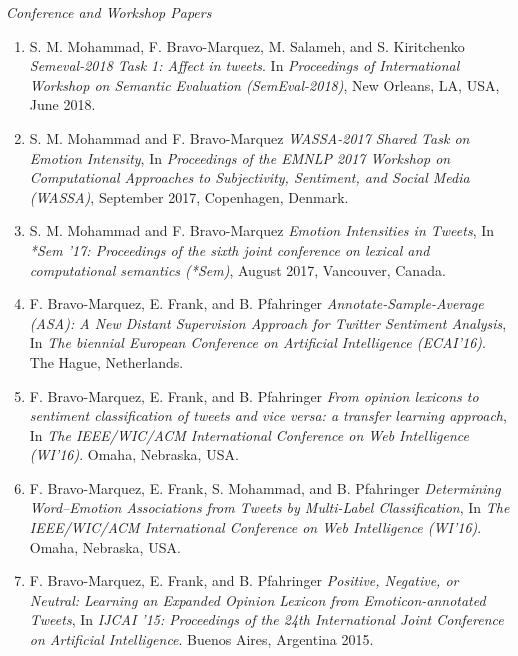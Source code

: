 \documentclass[letterpaper]{article}
\begin{document}
\begin{flushleft}
\emph{Conference and Workshop Papers}
\end{flushleft}

\begin{enumerate}

\item S. M. Mohammad, F. Bravo-Marquez, M. Salameh, and S. Kiritchenko  \textit{Semeval-2018 Task 1: Affect in tweets}. In \textit{Proceedings of International Workshop on Semantic Evaluation (SemEval-2018)}, New Orleans, LA, USA, June 2018. 

\item  S. M. Mohammad and F. Bravo-Marquez \textit{WASSA-2017 Shared Task on Emotion Intensity}, In \textit{Proceedings of the EMNLP 2017 Workshop on Computational Approaches to Subjectivity, Sentiment, and Social Media (WASSA)}, September 2017, Copenhagen, Denmark. 

\item S. M. Mohammad and F. Bravo-Marquez \textit{Emotion Intensities in Tweets}, In \textit{*Sem '17: Proceedings of the sixth joint conference on lexical and computational semantics (*Sem)}, August 2017, Vancouver, Canada. 


\item F. Bravo-Marquez, E. Frank, and B. Pfahringer \textit{Annotate-Sample-Average (ASA): A New Distant
Supervision Approach for Twitter Sentiment Analysis}, In \textit{The biennial European Conference  on Artificial Intelligence (ECAI'16)}. The Hague, Netherlands.


\item F. Bravo-Marquez, E. Frank, and B. Pfahringer \textit{From opinion lexicons to sentiment classification of
tweets and vice versa: a transfer learning approach}, In \textit{The IEEE/WIC/ACM International Conference on Web Intelligence (WI'16)}. Omaha, Nebraska, USA.


\item F. Bravo-Marquez, E. Frank, S. Mohammad, and B. Pfahringer \textit{Determining Word--Emotion Associations from Tweets by Multi-Label Classification}, In \textit{The IEEE/WIC/ACM International Conference on Web Intelligence (WI'16)}. Omaha, Nebraska, USA.

\item F. Bravo-Marquez, E. Frank, and B. Pfahringer \textit{Positive, Negative, or Neutral: Learning an Expanded Opinion Lexicon from Emoticon-annotated Tweets}, In \textit{IJCAI '15: Proceedings of the 24th International Joint Conference on Artificial Intelligence}. Buenos Aires, Argentina 2015.


\end{enumerate}
\end{document}
